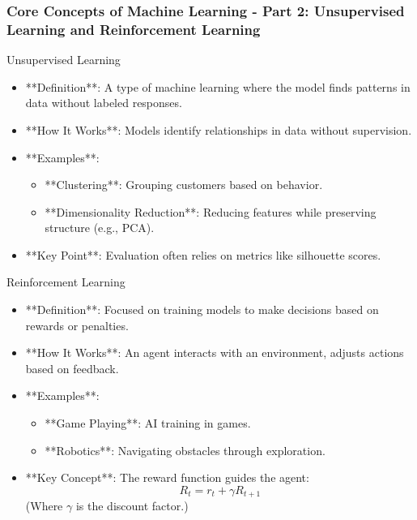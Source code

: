 \documentclass{beamer}
\begin{document}
\begin{frame}[fragile]
    \frametitle{Core Concepts of Machine Learning - Part 2: Unsupervised Learning and Reinforcement Learning}
    
    \begin{block}{Unsupervised Learning}
        \begin{itemize}
            \item **Definition**: A type of machine learning where the model finds patterns in data without labeled responses.
            \item **How It Works**: Models identify relationships in data without supervision.
            \item **Examples**:
                \begin{itemize}
                    \item **Clustering**: Grouping customers based on behavior.
                    \item **Dimensionality Reduction**: Reducing features while preserving structure (e.g., PCA).
                \end{itemize}
            \item **Key Point**: Evaluation often relies on metrics like silhouette scores.
        \end{itemize}
    \end{block}

    \begin{block}{Reinforcement Learning}
        \begin{itemize}
            \item **Definition**: Focused on training models to make decisions based on rewards or penalties.
            \item **How It Works**: An agent interacts with an environment, adjusts actions based on feedback.
            \item **Examples**:
                \begin{itemize}
                    \item **Game Playing**: AI training in games.
                    \item **Robotics**: Navigating obstacles through exploration.
                \end{itemize}
            \item **Key Concept**: The reward function guides the agent:
                \begin{equation}
                R_t = r_t + \gamma R_{t+1}
                \end{equation}
                (Where \( \gamma \) is the discount factor.)
        \end{itemize}
    \end{block}
\end{frame}
\end{document}

